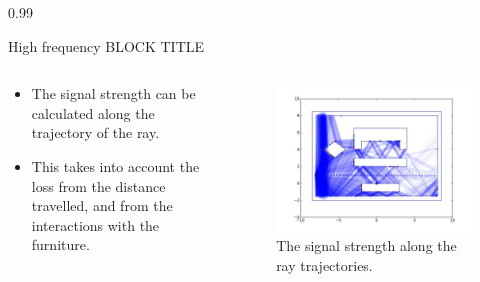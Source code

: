 \documentclass[final]{beamer}
\theoremstyle{plain}
\theoremstyle{definition}
\theoremstyle{remark}
\newlength{\twocolwid}
\begin{document}
\begin{frame}[t]
\begin{columns}[t]
\begin{column}{0.99\twocolwid}
\begin{alertblock}{High frequency BLOCK TITLE
}
\begin{columns}
\begin{column}{0.5\linewidth}
\begin{itemize}
\item The signal strength can be calculated along the trajectory of the ray. 
\item This takes into account the loss from the distance travelled, and from the interactions with the furniture.
\end{itemize}
\end{column}
\begin{column}{0.45\linewidth}
\begin{figure}[H]
\includegraphics[scale=0.5]{signalcoverage2.jpeg} 
\caption{The signal strength along the ray trajectories.
}
\end{figure}
\end{column}
\end{columns}
\end{alertblock}


\end{column}
\end{columns}
\end{frame}
\end{document}
